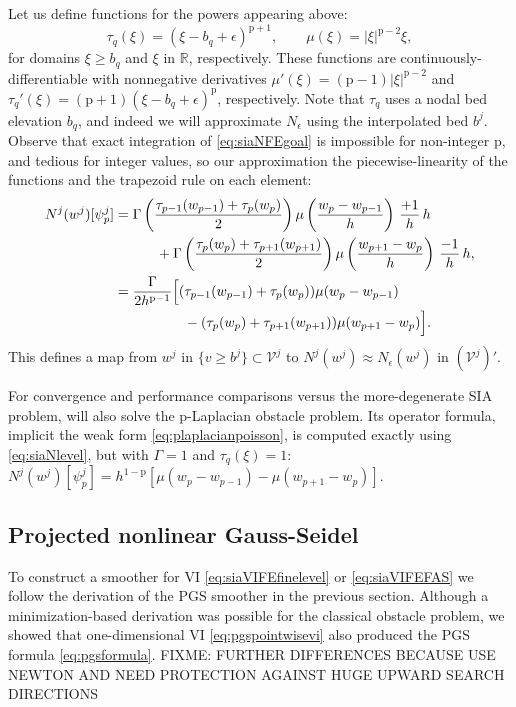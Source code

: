 \documentclass[letterpaper,final,12pt,reqno]{amsart}
\theoremstyle{claim}
\newcommand{\eps}{\epsilon}
\newcommand{\RR}{\mathbb{R}}
\newcommand{\pp}{{\text{p}}}
\numberwithin{equation}{section}
\numberwithin{figure}{section}
\numberwithin{table}{section}
\numberwithin{theorem}{section}
\begin{document}
Let us define functions for the powers appearing above:
\begin{equation}
\tau_q(\xi)  = (\xi - b_q + \eps)^{\pp+1}, \qquad \mu(\xi) = |\xi|^{\pp-2} \xi, \label{eq:siahelperfcns}
\end{equation}
for domains $\xi \ge b_q$ and $\xi$ in $\RR$, respectively.  These functions are continuously-differentiable with nonnegative derivatives $\mu'(\xi) = (\pp-1) |\xi|^{\pp-2}$ and $\tau_q'(\xi) = (\pp+1) (\xi-b_q + \eps)^{\pp}$, respectively.  Note that $\tau_q$ uses a nodal bed elevation $b_q$, and indeed we will approximate $N_\eps$ using the interpolated bed $b^j$.  Observe that exact integration of \eqref{eq:siaNFEgoal} is impossible for non-integer $\pp$, and tedious for integer values, so our approximation the piecewise-linearity of the functions and the trapezoid rule on each element:
\begin{align}
N^j(w^j)[\psi_p^j] &= \Gamma \left(\frac{\tau_{p-1}(w_{p-1}) + \tau_p(w_p)}{2}\right) \mu\left(\frac{w_p-w_{p-1}}{h}\right)\, \frac{+1}{h}\, h \notag \\
    &\qquad\quad  + \Gamma \left(\frac{\tau_p(w_p) + \tau_{p+1}(w_{p+1})}{2}\right) \mu\left(\frac{w_{p+1}-w_p}{h}\right)\, \frac{-1}{h}\, h, \notag \\
    &= \frac{\Gamma}{2h^{\pp-1}} \Big[(\tau_{p-1}(w_{p-1}) + \tau_p(w_p)) \mu(w_p-w_{p-1})  \label{eq:siaNlevel} \\
    &\qquad\qquad\quad - (\tau_p(w_p) + \tau_{p+1}(w_{p+1})) \mu(w_{p+1}-w_p)\Big]. \notag
\end{align}
This defines a map from $w^j$ in $\{v \ge b^j\} \subset \mathcal{V}^j$ to $N^j(w^j) \approx N_\eps(w^j)$ in $(\mathcal{V}^j)'$.

For convergence and performance comparisons versus the more-degenerate SIA problem, will also solve the $\pp$-Laplacian obstacle problem.  Its operator formula, implicit the weak form \eqref{eq:plaplacianpoisson}, is computed exactly using \eqref{eq:siaNlevel}, but with $\Gamma = 1$ and $\tau_q(\xi)=1$: $N^j(w^j)[\psi_p^j] = h^{1-\pp} \left[\mu(w_p-w_{p-1}) - \mu(w_{p+1}-w_p)\right]$.

\subsection{Projected nonlinear Gauss-Seidel} \label{subsec:pngs}  To construct a smoother for VI \eqref{eq:siaVIFEfinelevel} or \eqref{eq:siaVIFEFAS} we follow the derivation of the PGS smoother in the previous section.  Although a minimization-based derivation was possible for the classical obstacle problem, we showed that one-dimensional VI \eqref{eq:pgspointwisevi} also produced the PGS formula \eqref{eq:pgsformula}.  FIXME: FURTHER DIFFERENCES BECAUSE USE NEWTON AND NEED PROTECTION AGAINST HUGE UPWARD SEARCH DIRECTIONS
\end{document}
